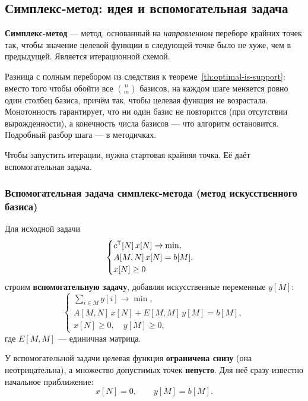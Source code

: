 \subsection{Симплекс-метод: идея и вспомогательная задача}

\begin{definition}
\textbf{Симплекс-метод} — метод, основанный на \emph{направленном} переборе крайних
точек так, чтобы значение целевой функции в следующей точке было не хуже, чем в
предыдущей. Является итерационной схемой.
\end{definition}

\begin{idea}
Разница с полным перебором из следствия к теореме~\ref{th:optimal-is-support}: вместо
того чтобы обойти все $\binom{n}{m}$ базисов, на каждом шаге меняется ровно один
столбец базиса, причём так, чтобы целевая функция не возрастала. Монотонность
гарантирует, что ни один базис не повторится (при отсутствии вырожденности), а
конечность числа базисов — что алгоритм остановится. Подробный разбор шага —
в методичках.
\end{idea}

Чтобы запустить итерации, нужна стартовая крайняя точка. Её даёт вспомогательная
задача.

\subsubsection*{Вспомогательная задача симплекс-метода (метод искусственного базиса)}

Для исходной задачи
\[
  \begin{cases}
    c^{\mathsf{T}}[N]\, x[N] \to \min, \\
    A[M,N]\, x[N] = b[M], \\
    x[N] \ge 0
  \end{cases}
\]
строим \textbf{вспомогательную задачу}, добавляя искусственные переменные $y[M]$:
\[
  \begin{cases}
    \displaystyle\sum_{i \in M} y[i] \to \min, \\[6pt]
    A[M,N]\, x[N] + E[M,M]\, y[M] = b[M], \\
    x[N] \ge 0, \quad y[M] \ge 0 ,
  \end{cases}
\]
где $E[M,M]$ — единичная матрица.

У вспомогательной задачи целевая функция \textbf{ограничена снизу} (она
неотрицательна), а множество допустимых точек \textbf{непусто}. Для неё сразу
известно начальное приближение:
\[
  x[N] = 0, \qquad y[M] = b[M] .
\]

